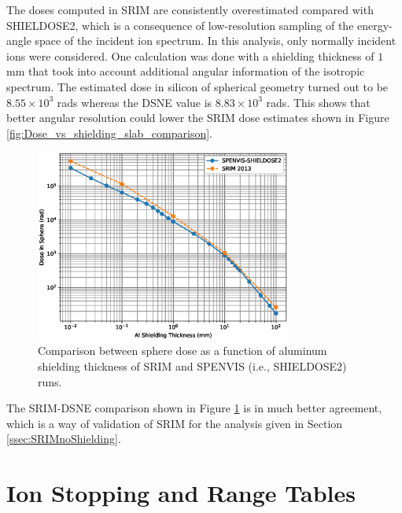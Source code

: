 \documentclass{hitec}
\begin{document}
The doses computed in SRIM are consistently overestimated compared with SHIELDOSE2, which is a consequence of low-resolution sampling of the energy-angle space of the incident ion spectrum. In this analysis, only normally incident ions were considered. One calculation was done with a shielding thickness of $1$ mm that took into account additional angular information of the isotropic spectrum. The estimated dose in silicon of spherical geometry turned out to be $8.55\times 10^{3}$ rads whereas the DSNE value is $8.83\times 10^{3}$ rads. This shows that better angular resolution could lower the SRIM dose estimates shown in Figure \ref{fig:Dose_vs_shielding_slab_comparison}.

\begin{figure}[h!]
	\centering
	\includegraphics[width=0.75\textwidth]{Dose_vs_shielding_sphere_comparison.eps}
	\caption{Comparison between sphere dose as a function of aluminum shielding thickness of SRIM and SPENVIS (i.e., SHIELDOSE2) runs.}\label{fig:Dose_vs_shielding_sphere_comparison}
\end{figure}

The SRIM-DSNE comparison shown in Figure \ref{fig:Dose_vs_shielding_sphere_comparison} is in much better agreement, which is a way of validation of SRIM for the analysis given in Section \ref{ssec:SRIMnoShielding}.

\newpage
\appendix
{}
\section{Ion Stopping and Range Tables}
\label{asec:IonStoppingRangeTables}


\end{document}
